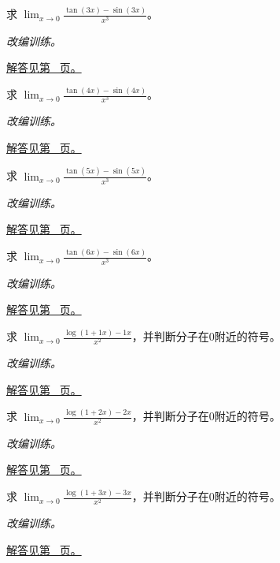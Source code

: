 \documentclass[UTF8,12pt,a4paper,fontset=fandol]{ctexart}
\begin{document}
\begin{example}[三角函数差的三阶项]\label{ex:c5q15}
求 $\displaystyle\lim_{x\to0}\frac{\tan(3x)-\sin(3x)}{x^3}$。
\par\textit{改编训练。}\par\hyperref[ans:c5q15]{解答见第~\pageref{ans:c5q15} 页。}
\end{example}
\begin{example}[三角函数差的三阶项]\label{ex:c5q16}
求 $\displaystyle\lim_{x\to0}\frac{\tan(4x)-\sin(4x)}{x^3}$。
\par\textit{改编训练。}\par\hyperref[ans:c5q16]{解答见第~\pageref{ans:c5q16} 页。}
\end{example}
\begin{example}[三角函数差的三阶项]\label{ex:c5q17}
求 $\displaystyle\lim_{x\to0}\frac{\tan(5x)-\sin(5x)}{x^3}$。
\par\textit{改编训练。}\par\hyperref[ans:c5q17]{解答见第~\pageref{ans:c5q17} 页。}
\end{example}
\begin{example}[三角函数差的三阶项]\label{ex:c5q18}
求 $\displaystyle\lim_{x\to0}\frac{\tan(6x)-\sin(6x)}{x^3}$。
\par\textit{改编训练。}\par\hyperref[ans:c5q18]{解答见第~\pageref{ans:c5q18} 页。}
\end{example}
\begin{example}[对数减去线性项]\label{ex:c5q19}
求 $\displaystyle\lim_{x\to0}\frac{\log(1+1x)-1x}{x^2}$，并判断分子在0附近的符号。
\par\textit{改编训练。}\par\hyperref[ans:c5q19]{解答见第~\pageref{ans:c5q19} 页。}
\end{example}
\begin{example}[对数减去线性项]\label{ex:c5q20}
求 $\displaystyle\lim_{x\to0}\frac{\log(1+2x)-2x}{x^2}$，并判断分子在0附近的符号。
\par\textit{改编训练。}\par\hyperref[ans:c5q20]{解答见第~\pageref{ans:c5q20} 页。}
\end{example}
\begin{example}[对数减去线性项]\label{ex:c5q21}
求 $\displaystyle\lim_{x\to0}\frac{\log(1+3x)-3x}{x^2}$，并判断分子在0附近的符号。
\par\textit{改编训练。}\par\hyperref[ans:c5q21]{解答见第~\pageref{ans:c5q21} 页。}
\end{example}
\end{document}
